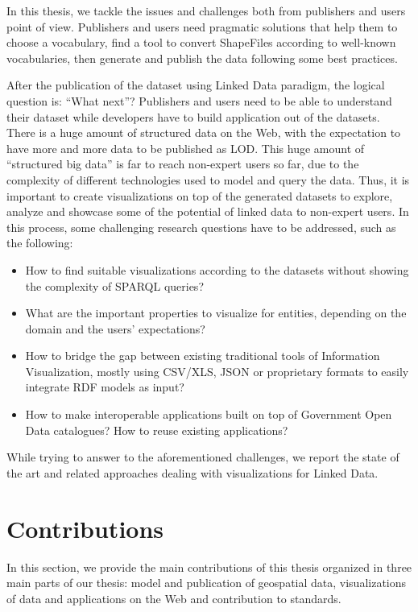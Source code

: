 \begin{enumerate}
In this thesis, we tackle the issues and challenges both from publishers and users point of view. Publishers and users need pragmatic solutions that help them to choose a vocabulary, find a tool to convert ShapeFiles according to well-known vocabularies, then generate and publish the data following some best practices.


After the publication of the dataset using Linked Data paradigm, the logical question is: ``What next''? Publishers and users need to be able to understand their dataset while developers have to build application out of the datasets. There is a huge amount of structured data on the Web, with the expectation to have more and more 
data to be published as LOD. This huge amount of ``structured big data'' is far to reach non-expert users 
so far, due to the complexity of different technologies used to model and query the data. Thus, it is 
important to create visualizations on top of the generated datasets to explore, analyze and showcase 
some of the potential of linked data to non-expert users. In this process, some challenging research questions have to be addressed, such as the following:

\begin{itemize}
\item  How to find suitable visualizations according to the datasets without showing the complexity of SPARQL queries?
 \item  What are the important properties to visualize for entities, depending on the domain and the users' expectations?
 \item  How to bridge the gap between existing traditional tools of Information Visualization, mostly using CSV/XLS, JSON or proprietary formats to easily integrate RDF models as input?
 \item How to make interoperable applications built on top of Government Open Data catalogues? How to reuse existing applications?
\end{itemize}
 
 While trying to answer to the aforementioned challenges, we report the state of the art and related approaches dealing with visualizations for Linked Data. 


\section{Contributions}
\label{sec:contributions}
In this section, we provide the main contributions of this thesis organized in three main parts of our thesis: model and publication of geospatial data, visualizations of data and applications on the Web and contribution to standards. 


\end{enumerate}
